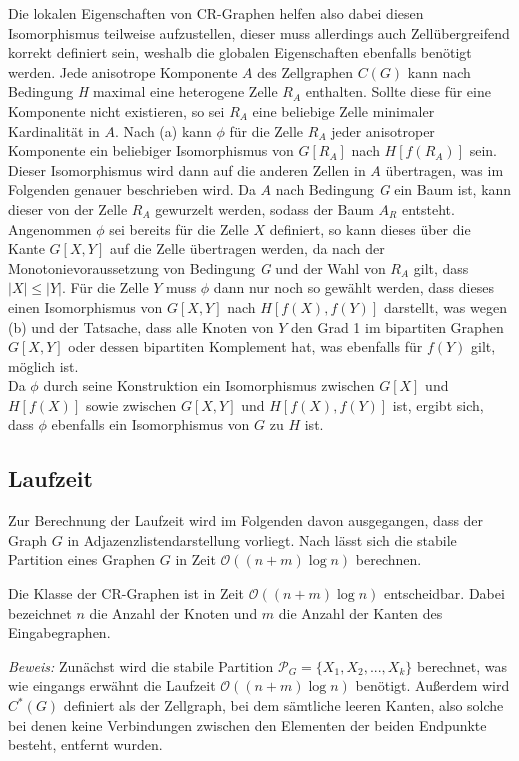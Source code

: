 Die lokalen Eigenschaften von CR-Graphen helfen also dabei diesen Isomorphismus teilweise aufzustellen, dieser muss allerdings auch Zellübergreifend korrekt definiert sein, weshalb die globalen Eigenschaften ebenfalls benötigt werden.
Jede anisotrope Komponente $A$ des Zellgraphen $C(G)$ kann nach Bedingung \emph{H} maximal eine heterogene Zelle $R_A$ enthalten.
Sollte diese für eine Komponente nicht existieren, so sei $R_A$ eine beliebige Zelle minimaler Kardinalität in $A$.
Nach (a) kann $\phi$ für die Zelle $R_A$ jeder anisotroper Komponente ein beliebiger Isomorphismus von $G[R_A]$ nach $H[f(R_A)]$ sein.
Dieser Isomorphismus wird dann auf die anderen Zellen in $A$ übertragen, was im Folgenden genauer beschrieben wird.
Da $A$ nach Bedingung \emph{G} ein Baum ist, kann dieser von der Zelle $R_A$ gewurzelt werden, sodass der Baum $A_R$ entsteht.
Angenommen $\phi$ sei bereits für die Zelle $X$ definiert, so kann dieses über die Kante $G[X,Y]$ auf die Zelle übertragen werden, da nach der Monotonievoraussetzung von Bedingung \emph{G} und der Wahl von $R_A$ gilt, dass $|X|\leq |Y|$.
Für die Zelle $Y$ muss $\phi$ dann nur noch so gewählt werden, dass dieses einen Isomorphismus von $G[X,Y]$ nach $H[f(X),f(Y)]$ darstellt, was wegen (b) und der Tatsache, dass alle Knoten von $Y$ den Grad 1 im bipartiten Graphen $G[X,Y]$ oder dessen bipartiten Komplement hat, was ebenfalls für $f(Y)$ gilt, möglich ist.\\

Da $\phi$ durch seine Konstruktion ein Isomorphismus zwischen $G[X]$ und $H[f(X)]$ sowie zwischen $G[X,Y]$ und $H[f(X),f(Y)]$ ist, ergibt sich, dass $\phi$ ebenfalls ein Isomorphismus von $G$ zu $H$ ist.

\subsection{Laufzeit}
Zur Berechnung der Laufzeit wird im Folgenden davon ausgegangen, dass der Graph $G$ in Adjazenzlistendarstellung vorliegt.
Nach \cite{CARDON198285} lässt sich die stabile Partition eines Graphen $G$ in Zeit $\mathcal{O}((n+m)\log n)$ berechnen.

\begin{Theorem}
	Die Klasse der CR-Graphen ist in Zeit $\mathcal{O}((n+m)\log n)$ entscheidbar. Dabei bezeichnet $n$ die Anzahl der Knoten und $m$ die Anzahl der Kanten des Eingabegraphen.
\end{Theorem}

\emph{Beweis:} Zunächst wird die stabile Partition $\mathcal{P}_G=\{X_1,X_2,...,X_k\}$ berechnet, was wie eingangs erwähnt die Laufzeit $\mathcal{O}((n+m)\log n)$ benötigt.
Außerdem wird $C^*(G)$ definiert als der Zellgraph, bei dem sämtliche leeren Kanten, also solche bei denen keine Verbindungen zwischen den Elementen der beiden Endpunkte besteht, entfernt wurden.

